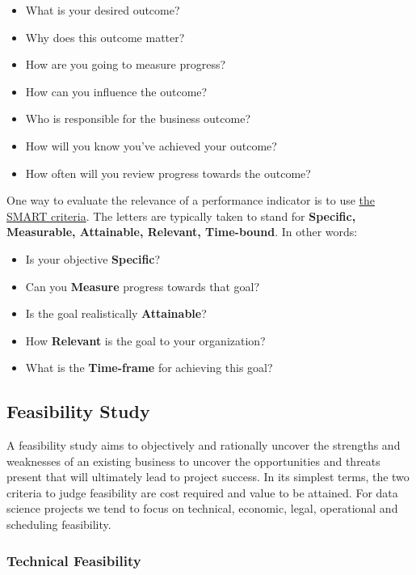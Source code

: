 \documentclass[
]{book}
\providecommand{\tightlist}{%
  \setlength{\itemsep}{0pt}\setlength{\parskip}{0pt}}
\begin{document}
\begin{itemize}
\tightlist
\item
  What is your desired outcome?
\item
  Why does this outcome matter?
\item
  How are you going to measure progress?
\item
  How can you influence the outcome?
\item
  Who is responsible for the business outcome?
\item
  How will you know you've achieved your outcome?
\item
  How often will you review progress towards the outcome?
\end{itemize}

One way to evaluate the relevance of a performance indicator is to use \href{http://en.wikipedia.org/wiki/SMART_criteria}{the SMART criteria}. The letters are typically taken to stand for \textbf{Specific, Measurable, Attainable, Relevant, Time-bound}. In other words:

\begin{itemize}
\tightlist
\item
  Is your objective \textbf{Specific}?
\item
  Can you \textbf{Measure} progress towards that goal?
\item
  Is the goal realistically \textbf{Attainable}?
\item
  How \textbf{Relevant} is the goal to your organization?
\item
  What is the \textbf{Time-frame} for achieving this goal?
\end{itemize}

\hypertarget{feasibility-study}{%
\subsection{Feasibility Study}\label{feasibility-study}}

A feasibility study aims to objectively and rationally uncover the strengths and weaknesses of an existing business to uncover the opportunities and threats present that will ultimately lead to project success. In its simplest terms, the two criteria to judge feasibility are cost required and value to be attained. For data science projects we tend to focus on technical, economic, legal, operational and scheduling feasibility.

\hypertarget{technical-feasibility}{%
\subsubsection{Technical Feasibility}\label{technical-feasibility}}
\end{document}
